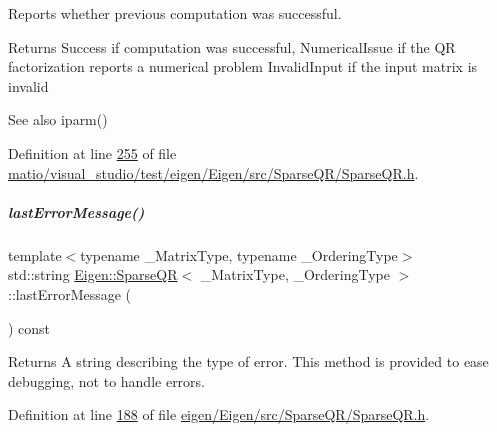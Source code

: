 Reports whether previous computation was successful. 

\begin{DoxyReturn}{Returns}
{\ttfamily Success} if computation was successful, {\ttfamily Numerical\+Issue} if the QR factorization reports a numerical problem {\ttfamily Invalid\+Input} if the input matrix is invalid
\end{DoxyReturn}
\begin{DoxySeeAlso}{See also}
iparm() 
\end{DoxySeeAlso}


Definition at line \hyperlink{matio_2visual__studio_2test_2eigen_2_eigen_2src_2_sparse_q_r_2_sparse_q_r_8h_source_l00255}{255} of file \hyperlink{matio_2visual__studio_2test_2eigen_2_eigen_2src_2_sparse_q_r_2_sparse_q_r_8h_source}{matio/visual\+\_\+studio/test/eigen/\+Eigen/src/\+Sparse\+Q\+R/\+Sparse\+Q\+R.\+h}.

\mbox{\label{group___sparse_q_r___module_a1222e59649d77125d91f1368cf293c63}} 
\subparagraph{\texorpdfstring{last\+Error\+Message()}{lastErrorMessage()}\hspace{0.1cm}{\footnotesize\ttfamily [1/2]}}
{\footnotesize\ttfamily template$<$typename \+\_\+\+Matrix\+Type, typename \+\_\+\+Ordering\+Type$>$ \\
std\+::string \hyperlink{group___sparse_q_r___module_class_eigen_1_1_sparse_q_r}{Eigen\+::\+Sparse\+QR}$<$ \+\_\+\+Matrix\+Type, \+\_\+\+Ordering\+Type $>$\+::last\+Error\+Message (\begin{DoxyParamCaption}{ }\end{DoxyParamCaption}) const\hspace{0.3cm}{\ttfamily [inline]}}

\begin{DoxyReturn}{Returns}
A string describing the type of error. This method is provided to ease debugging, not to handle errors. 
\end{DoxyReturn}


Definition at line \hyperlink{eigen_2_eigen_2src_2_sparse_q_r_2_sparse_q_r_8h_source_l00188}{188} of file \hyperlink{eigen_2_eigen_2src_2_sparse_q_r_2_sparse_q_r_8h_source}{eigen/\+Eigen/src/\+Sparse\+Q\+R/\+Sparse\+Q\+R.\+h}.

